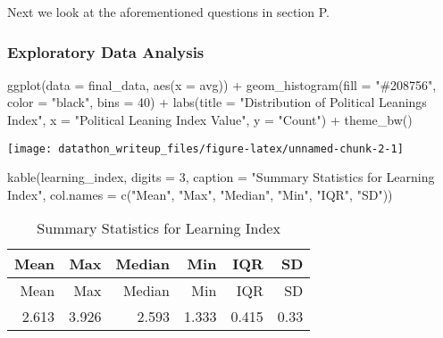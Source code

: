 \documentclass[
]{article}
\newenvironment{Shaded}{\begin{snugshade}}{\end{snugshade}}
\newcommand{\AttributeTok}[1]{\textcolor[rgb]{0.77,0.63,0.00}{#1}}
\newcommand{\DecValTok}[1]{\textcolor[rgb]{0.00,0.00,0.81}{#1}}
\newcommand{\FunctionTok}[1]{\textcolor[rgb]{0.00,0.00,0.00}{#1}}
\newcommand{\NormalTok}[1]{#1}
\newcommand{\SpecialCharTok}[1]{\textcolor[rgb]{0.00,0.00,0.00}{#1}}
\newcommand{\StringTok}[1]{\textcolor[rgb]{0.31,0.60,0.02}{#1}}
\begin{document}
Next we look at the aforementioned questions in section P.

\hypertarget{exploratory-data-analysis}{%
\subsubsection{Exploratory Data
Analysis}\label{exploratory-data-analysis}}

\begin{Shaded}
\begin{Highlighting}[]
\FunctionTok{ggplot}\NormalTok{(}\AttributeTok{data =}\NormalTok{ final\_data, }\FunctionTok{aes}\NormalTok{(}\AttributeTok{x =}\NormalTok{ avg)) }\SpecialCharTok{+}
  \FunctionTok{geom\_histogram}\NormalTok{(}\AttributeTok{fill =} \StringTok{"\#208756"}\NormalTok{, }\AttributeTok{color =} \StringTok{"black"}\NormalTok{, }\AttributeTok{bins =} \DecValTok{40}\NormalTok{) }\SpecialCharTok{+}
  \FunctionTok{labs}\NormalTok{(}\AttributeTok{title =} \StringTok{"Distribution of Political Leanings Index"}\NormalTok{,}
       \AttributeTok{x =} \StringTok{"Political Leaning Index Value"}\NormalTok{,}
       \AttributeTok{y =} \StringTok{"Count"}\NormalTok{)  }\SpecialCharTok{+}
  \FunctionTok{theme\_bw}\NormalTok{()}
\end{Highlighting}
\end{Shaded}

\begin{center}\texttt{[image: datathon\_writeup\_files/figure-latex/unnamed-chunk-2-1]} \end{center}

\begin{Shaded}
\begin{Highlighting}[]
\FunctionTok{kable}\NormalTok{(learning\_index, }\AttributeTok{digits =} \DecValTok{3}\NormalTok{,}
      \AttributeTok{caption =} \StringTok{"Summary Statistics for Learning Index"}\NormalTok{,}
      \AttributeTok{col.names =} \FunctionTok{c}\NormalTok{(}\StringTok{"Mean"}\NormalTok{, }\StringTok{"Max"}\NormalTok{, }\StringTok{"Median"}\NormalTok{, }\StringTok{"Min"}\NormalTok{, }\StringTok{"IQR"}\NormalTok{, }\StringTok{"SD"}\NormalTok{))}
\end{Highlighting}
\end{Shaded}

\begin{longtable}[]{@{}rrrrrr@{}}
\caption{Summary Statistics for Learning Index}\tabularnewline
\toprule
Mean & Max & Median & Min & IQR & SD \\
\midrule
\endfirsthead
\toprule
Mean & Max & Median & Min & IQR & SD \\
\midrule
\endhead
2.613 & 3.926 & 2.593 & 1.333 & 0.415 & 0.33 \\
\bottomrule
\end{longtable}
\end{document}
